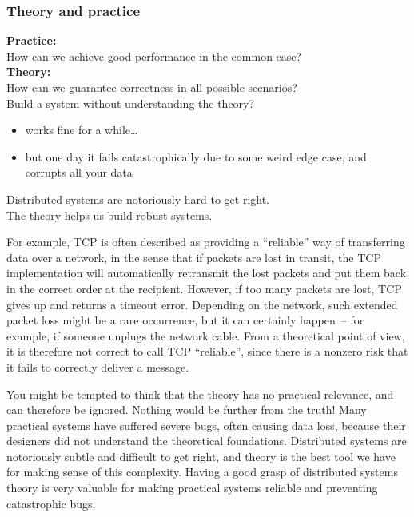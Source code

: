\begin{frame}
    \label{s:theory-practice}
    \frametitle{Theory and practice}
    \textbf{Practice:}\\ How can we achieve good performance in the common case? \\[1em]
    \textbf{Theory:}\\ How can we guarantee correctness in all possible scenarios? \pause\\[1em]
    Build a system without understanding the theory?
    \begin{itemize}
        \item works fine for a while\dots\\
        \item but one day it fails catastrophically due to some weird edge case, and corrupts all your data
             \pause\\[1em]
    \end{itemize}
    Distributed systems are notoriously hard to get right.\\
    The theory helps us build robust systems.
\end{frame}
\label{l:theory-practice}

For example, TCP is often described as providing a ``reliable'' way of transferring data over a network, in the sense that if packets are lost in transit, the TCP implementation will automatically retransmit the lost packets and put them back in the correct order at the recipient.
However, if too many packets are lost, TCP gives up and returns a timeout error.
Depending on the network, such extended packet loss might be a rare occurrence, but it can certainly happen~-- for example, if someone unplugs the network cable.
From a theoretical point of view, it is therefore not correct to call TCP ``reliable'', since there is a nonzero risk that it fails to correctly deliver a message.

You might be tempted to think that the theory has no practical relevance, and can therefore be ignored.
Nothing would be further from the truth!
Many practical systems have suffered severe bugs, often causing data loss, because their designers did not understand the theoretical foundations.
Distributed systems are notoriously subtle and difficult to get right, and theory is the best tool we have for making sense of this complexity.
Having a good grasp of distributed systems theory is very valuable for making practical systems reliable and preventing catastrophic bugs.

